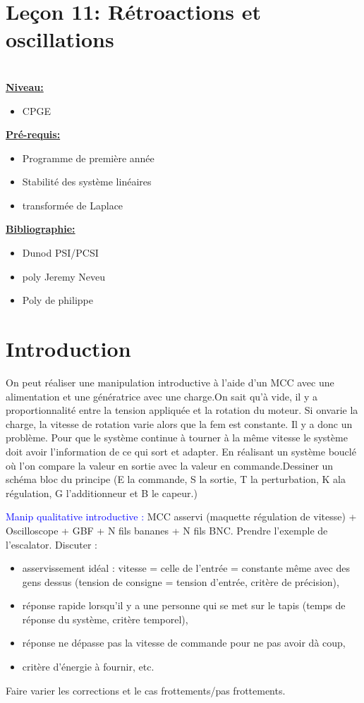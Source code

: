 \documentclass[french, a4paper, 10pt, twocolumn, landscape]{article}
\begin{document}
\section*{Leçon 11: Rétroactions et oscillations}

\hrulefill\\

\noindent\underline{\textbf{Niveau:}}
\begin{itemize}
  \item CPGE 
\end{itemize}
\underline{\textbf{Pr{\'e}-requis: }}

\begin{itemize}  
\item Programme de première année
\item Stabilité des système linéaires
\item transformée de Laplace
\end{itemize}
\underline{\textbf{Bibliographie:}}

\begin{itemize}
  \item Dunod PSI/PCSI
  \item poly Jeremy Neveu
  \item Poly de philippe
\end{itemize}
\hrulefill


\section*{Introduction}

On peut réaliser une manipulation introductive à l'aide d'un MCC avec une alimentation et une génératrice avec une charge.On sait qu'à vide, il y a proportionnalité entre la tension appliquée et la rotation du moteur. Si onvarie la charge, la vitesse de rotation varie alors que la fem est constante. Il y a donc un problème. Pour que le système continue à tourner à la même vitesse le système doit avoir l'information de ce qui sort et adapter. En réalisant un système bouclé où l'on compare la valeur en sortie avec la valeur en commande.Dessiner un schéma bloc du principe (E la commande, S la sortie, T la perturbation, K ala régulation, G l'additionneur et B le capeur.) \medskip

\textcolor{blue}{Manip qualitative introductive :} MCC asservi (maquette régulation de vitesse) + Oscilloscope + GBF + N fils bananes + N fils BNC. Prendre l'exemple de l'escalator. Discuter : 
\begin{itemize}
    \item asservissement idéal : vitesse = celle de l'entrée = constante même avec des gens dessus (tension de consigne = tension d'entrée, critère de précision),
    \item réponse rapide lorsqu'il y a une personne qui se met sur le tapis (temps de réponse du système, critère temporel),
    \item réponse ne dépasse pas la vitesse de commande pour ne pas avoir dà coup,
    \item critère d'énergie à fournir, etc.
\end{itemize}
Faire varier les corrections et le cas frottements/pas frottements.\\
\end{document}
